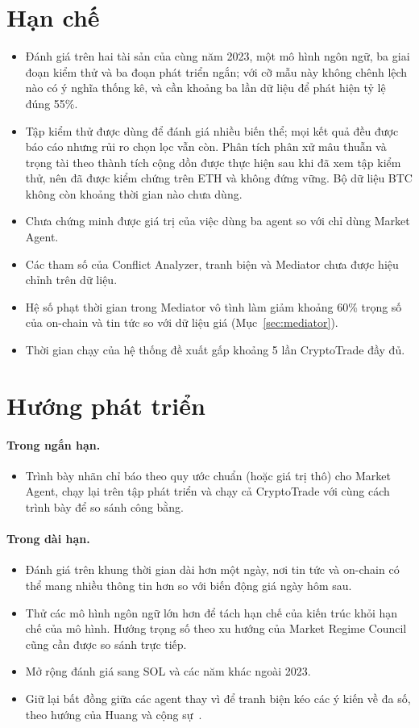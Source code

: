 \section{Hạn chế}
\begin{itemize}
  \item Đánh giá trên hai tài sản của cùng năm 2023, một mô hình ngôn ngữ, ba giai đoạn kiểm thử và ba đoạn phát triển ngắn; với cỡ mẫu
  này không chênh lệch nào có ý nghĩa thống kê, và cần khoảng ba lần dữ liệu để phát hiện tỷ lệ đúng 55\%.
  \item Tập kiểm thử được dùng để đánh giá nhiều biến thể; mọi kết quả đều được báo cáo nhưng rủi ro chọn lọc vẫn còn.
  Phân tích phân xử mâu thuẫn và trọng tài theo thành tích cộng dồn được thực hiện sau khi đã xem tập kiểm thử, nên
  đã được kiểm chứng trên ETH và không đứng vững. Bộ dữ liệu BTC không còn khoảng thời gian nào chưa dùng.
  \item Chưa chứng minh được giá trị của việc dùng ba agent so với chỉ dùng Market Agent.
  \item Các tham số của Conflict Analyzer, tranh biện và Mediator chưa được hiệu chỉnh trên dữ liệu.
  \item Hệ số phạt thời gian trong Mediator vô tình làm giảm khoảng 60\% trọng số của on-chain và tin tức so với dữ liệu
  giá (Mục~\ref{sec:mediator}).
  \item Thời gian chạy của hệ thống đề xuất gấp khoảng 5 lần CryptoTrade đầy đủ.
\end{itemize}

\section{Hướng phát triển}
\paragraph{Trong ngắn hạn.}
\begin{itemize}
  \item Trình bày nhãn chỉ báo theo quy ước chuẩn (hoặc giá trị thô) cho Market Agent, chạy lại trên tập phát triển và
  chạy cả CryptoTrade với cùng cách trình bày để so sánh công bằng.
\end{itemize}

\paragraph{Trong dài hạn.}
\begin{itemize}
  \item Đánh giá trên khung thời gian dài hơn một ngày, nơi tin tức và on-chain có thể mang nhiều thông tin hơn so với
  biến động giá ngày hôm sau.
  \item Thử các mô hình ngôn ngữ lớn hơn để tách hạn chế của kiến trúc khỏi hạn chế của mô hình. Hướng trọng số theo xu
  hướng của Market Regime Council~\cite{mrc2026} cũng cần được so sánh trực tiếp.
  \item Mở rộng đánh giá sang SOL và các năm khác ngoài 2023.
  \item Giữ lại bất đồng giữa các agent thay vì để tranh biện kéo các ý kiến về đa số, theo hướng của Huang và cộng
  sự~\cite{huang2026debate}.
\end{itemize}
